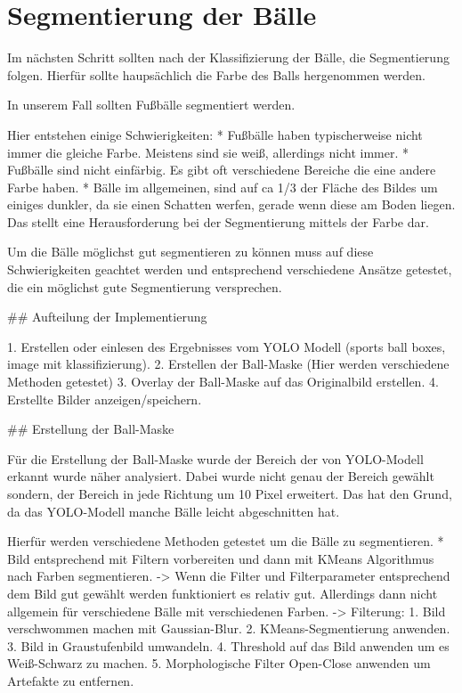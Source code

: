 \section{Segmentierung der Bälle}

Im nächsten Schritt sollten nach der Klassifizierung der Bälle, die Segmentierung folgen. Hierfür sollte haupsächlich die Farbe des Balls hergenommen werden.

In unserem Fall sollten Fußbälle segmentiert werden.

Hier entstehen einige Schwierigkeiten:
* Fußbälle haben typischerweise nicht immer die gleiche Farbe. Meistens sind sie weiß, allerdings nicht immer.
* Fußbälle sind nicht einfärbig. Es gibt oft verschiedene Bereiche die eine andere Farbe haben.
* Bälle im allgemeinen, sind auf ca 1/3 der Fläche des Bildes um einiges dunkler, da sie einen Schatten werfen, gerade wenn diese am Boden liegen. Das stellt eine Herausforderung bei der Segmentierung mittels der Farbe dar.

Um die Bälle möglichst gut segmentieren zu können muss auf diese Schwierigkeiten geachtet werden und entsprechend verschiedene Ansätze getestet, die ein möglichst gute Segmentierung versprechen.


## Aufteilung der Implementierung

1. Erstellen oder einlesen des Ergebnisses vom YOLO Modell (sports ball boxes, image mit klassifizierung).
2. Erstellen der Ball-Maske (Hier werden verschiedene Methoden getestet)
3. Overlay der Ball-Maske auf das Originalbild erstellen.
4. Erstellte Bilder anzeigen/speichern.



## Erstellung der Ball-Maske

Für die Erstellung der Ball-Maske wurde der Bereich der von YOLO-Modell erkannt wurde näher analysiert. Dabei wurde nicht genau der Bereich gewählt sondern, der Bereich in jede Richtung um 10 Pixel erweitert. Das hat den Grund, da das YOLO-Modell manche Bälle leicht abgeschnitten hat.

Hierfür werden verschiedene Methoden getestet um die Bälle zu segmentieren.
* Bild entsprechend mit Filtern vorbereiten und dann mit KMeans Algorithmus nach Farben segmentieren.
    -> Wenn die Filter und Filterparameter entsprechend dem Bild gut gewählt werden funktioniert es relativ gut. Allerdings dann nicht allgemein für verschiedene Bälle mit verschiedenen Farben.
    -> Filterung:
        1. Bild verschwommen machen mit Gaussian-Blur.
        2. KMeans-Segmentierung anwenden.
        3. Bild in Graustufenbild umwandeln.
        4. Threshold auf das Bild anwenden um es Weiß-Schwarz zu machen.
        5. Morphologische Filter Open-Close anwenden um Artefakte zu entfernen.

